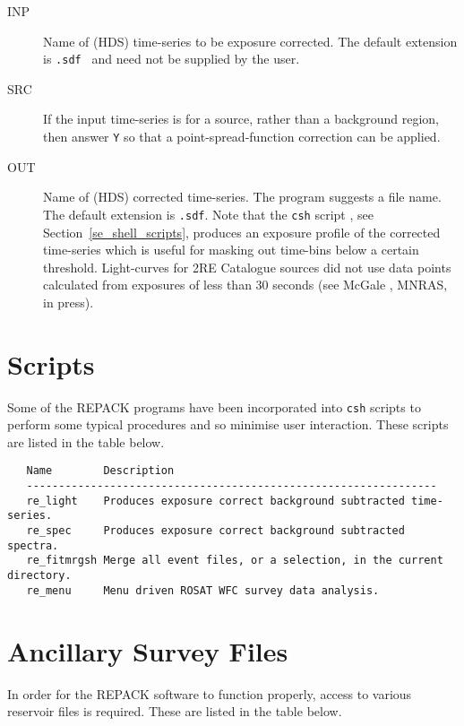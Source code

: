 \begin{description}
\item[INP   ]
Name of (HDS) time-series to be exposure corrected. The default extension is 
{\tt .sdf } and need not be supplied by the user.
\item[SRC   ]
If the input time-series is for a source, rather than a background
region, then answer {\tt Y} so that a point-spread-function correction
can be applied.
\item[OUT   ]
Name of (HDS) corrected time-series. The program suggests a file name.
The default extension is {\tt .sdf}. Note that the {\tt csh} script
, see
Section~\ref{se_shell_scripts}, produces an exposure profile of the
corrected time-series which is useful for masking out time-bins below a
certain threshold.  Light-curves for 2RE Catalogue sources did not use
data points calculated from exposures of less than 30 seconds (see
McGale \etal, MNRAS, in press).
\end{description}

\section{\label{se_shell_scripts} Scripts}

Some of the REPACK programs have been incorporated into {\tt csh}
scripts to perform some typical procedures and so minimise user interaction. 
These scripts are listed in the table below.

\begin{verbatim}
   Name        Description
   ----------------------------------------------------------------
   re_light    Produces exposure correct background subtracted time-series.
   re_spec     Produces exposure correct background subtracted spectra.
   re_fitmrgsh Merge all event files, or a selection, in the current directory.
   re_menu     Menu driven ROSAT WFC survey data analysis.
\end{verbatim}

\section{\label{se_ancilliary_files}Ancillary Survey Files}

In order for the REPACK software to function properly,  access to various
reservoir files is required.  These are listed in the table below.

